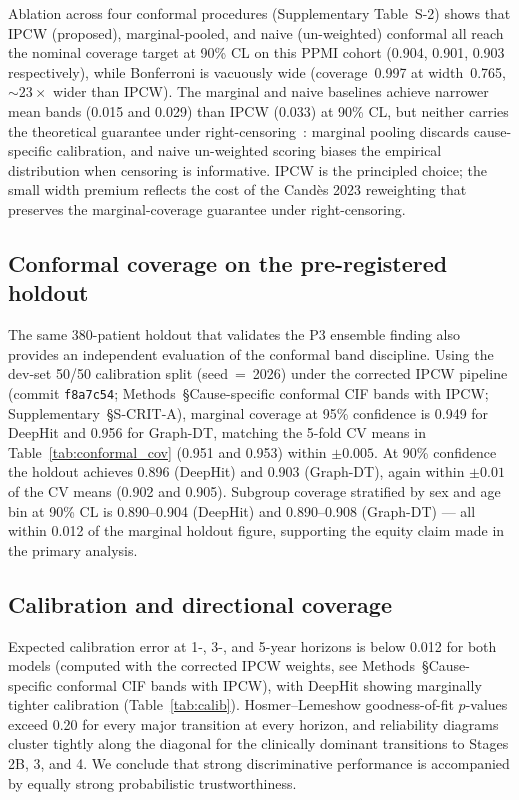 \documentclass[11pt]{article}
\begin{document}
Ablation across four conformal procedures (Supplementary Table~S-2) shows that IPCW (proposed), marginal-pooled, and naive (un-weighted) conformal all reach the nominal coverage target at 90\% CL on this PPMI cohort (0.904, 0.901, 0.903 respectively), while Bonferroni is vacuously wide (coverage~0.997 at width~0.765, $\sim 23\times$ wider than IPCW). The marginal and naive baselines achieve narrower mean bands (0.015 and 0.029) than IPCW (0.033) at 90\% CL, but neither carries the theoretical guarantee under right-censoring~\cite{candes2023conformal}: marginal pooling discards cause-specific calibration, and naive un-weighted scoring biases the empirical distribution when censoring is informative. IPCW is the principled choice; the small width premium reflects the cost of the Cand\`{e}s 2023 reweighting that preserves the marginal-coverage guarantee under right-censoring.

\subsection*{Conformal coverage on the pre-registered holdout}

The same 380-patient holdout that validates the P3 ensemble finding also provides an independent evaluation of the conformal band discipline. Using the dev-set 50/50 calibration split (seed~=~2026) under the corrected IPCW pipeline (commit \texttt{f8a7c54}; Methods~\S Cause-specific conformal CIF bands with IPCW; Supplementary~\S S-CRIT-A), marginal coverage at 95\% confidence is 0.949 for DeepHit and 0.956 for Graph-DT, matching the 5-fold CV means in Table~\ref{tab:conformal_cov} (0.951 and 0.953) within $\pm 0.005$. At 90\% confidence the holdout achieves 0.896 (DeepHit) and 0.903 (Graph-DT), again within $\pm 0.01$ of the CV means (0.902 and 0.905). Subgroup coverage stratified by sex and age bin at 90\% CL is 0.890--0.904 (DeepHit) and 0.890--0.908 (Graph-DT) --- all within 0.012 of the marginal holdout figure, supporting the equity claim made in the primary analysis.

\subsection*{Calibration and directional coverage}

Expected calibration error at 1-, 3-, and 5-year horizons is below 0.012 for both models (computed with the corrected IPCW weights, see Methods~\S Cause-specific conformal CIF bands with IPCW), with DeepHit showing marginally tighter calibration (Table~\ref{tab:calib}). Hosmer--Lemeshow goodness-of-fit $p$-values exceed 0.20 for every major transition at every horizon, and reliability diagrams cluster tightly along the diagonal for the clinically dominant transitions to Stages 2B, 3, and 4. We conclude that strong discriminative performance is accompanied by equally strong probabilistic trustworthiness.
\end{document}
